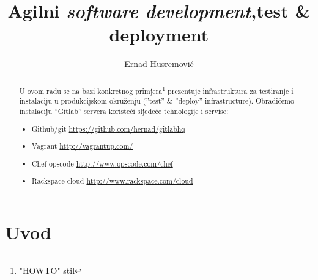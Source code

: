 \documentclass[times, utf8, seminar]{fit}
\begin{document}





\title{Agilni \emph{software development},\newline test \& deployment}

\author{Ernad Husremović}


\maketitle

\tableofcontents

\newpage

\begin{abstract}

U ovom radu se na bazi konkretnog primjera\footnote{"HOWTO" stil} prezentuje infrastruktura za testiranje i instalaciju u produkcijskom okruženju (''test'' \& ''deploy'' infrastructure). Obradićemo instalaciju ''Gitlab'' servera koristeći sljedeće tehnologije i servise:
\begin{itemize}
  \item Github/git \url{https://github.com/hernad/gitlabhq}
  \item Vagrant  \url{http://vagrantup.com/}
  \item Chef opscode \url{http://www.opscode.com/chef}
  \item Rackspace cloud \url{http://www.rackspace.com/cloud}
\end{itemize}

\end{abstract}


\chapter{Uvod}

\end{document}
